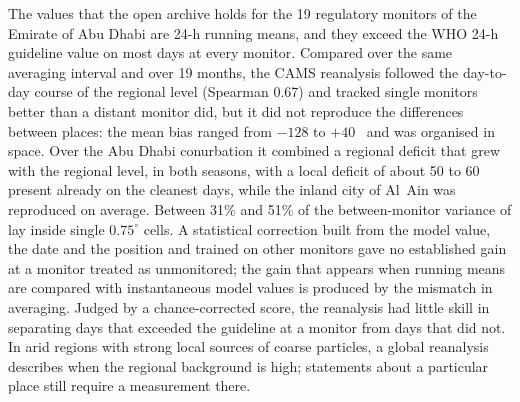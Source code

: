 The \pmten{} values that the open archive holds for the 19 regulatory monitors of the Emirate of
Abu Dhabi are 24-h running means, and they exceed the WHO 24-h guideline value on most days at
every monitor. Compared over the same averaging interval and over 19 months, the CAMS reanalysis
followed the day-to-day course of the regional level (Spearman 0.67) and tracked single monitors
better than a distant monitor did, but it did not reproduce the differences between places: the
mean bias ranged from $-128$ to $+40$~\ugm{} and was organised in space. Over the Abu Dhabi
conurbation it combined a regional deficit that grew with the regional level, in both seasons,
with a local deficit of about 50 to 60~\ugm{} present already on the cleanest days, while the inland
city of Al~Ain was reproduced on average. Between 31\% and 51\% of the between-monitor variance of \pmten{} lay
inside single $0.75^{\circ}$ cells. A statistical correction built from the model value, the date and the position and trained on
other monitors gave no established gain at a monitor treated as unmonitored; the gain that appears when running means
are compared with instantaneous model values is produced by the mismatch in averaging. Judged by a chance-corrected score, the
reanalysis had little skill in separating days that exceeded the guideline at a monitor from days
that did not. In arid regions with strong local sources of coarse particles, a global reanalysis
describes when the regional background is high; statements about a particular place still require
a measurement there.
